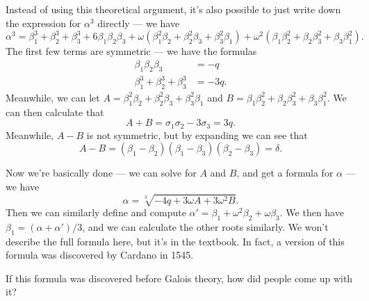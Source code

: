 Instead of using this theoretical argument, it's also possible to just write down the expression for $\alpha^3$ directly --- we have \[\alpha^3 = \beta_1^3 + \beta_2^3 + \beta_3^3 + 6\beta_1\beta_2\beta_3 + \omega(\beta_1^2\beta_2 + \beta_2^2\beta_3 + \beta_3^2\beta_1) + \omega^2(\beta_1\beta_2^2 + \beta_2\beta_3^2 + \beta_3\beta_1^2).\] The first few terms are symmetric --- we have the formulas \begin{align*}
    \beta_1\beta_2\beta_3 &= -q \\
    \beta_1^3 + \beta_2^3 + \beta_3^3 &= -3q.
\end{align*} Meanwhile, we can let $A = \beta_1^2\beta_2 + \beta_2^2\beta_3 + \beta_3^2\beta_1$ and $B = \beta_1\beta_2^2 + \beta_2\beta_3^2 + \beta_3\beta_1^2$. We can then calculate that \[A + B = \sigma_1\sigma_2 - 3\sigma_3 = 3q.\] Meanwhile, $A - B$ is not symmetric, but by expanding we can see that \[A - B = (\beta_1 - \beta_2)(\beta_1 - \beta_3)(\beta_2 - \beta_3) = \delta.\] 

Now we're basically done --- we can solve for $A$ and $B$, and get a formula for $\alpha$ --- we have \[\alpha = \sqrt[3]{-4q + 3\omega A + 3\omega^2 B}.\]  Then we can similarly define and compute $\alpha' = \beta_1 + \omega^2 \beta_2 + \omega \beta_3$. We then have $\beta_1 = (\alpha + \alpha')/3$, and we can calculate the other roots similarly. We won't describe the full formula here, but it's in the textbook. In fact, a version of this formula was discovered by Cardano in 1545.

\begin{question}
    If this formula was discovered before Galois theory, how did people come up with it? 
\end{question}

